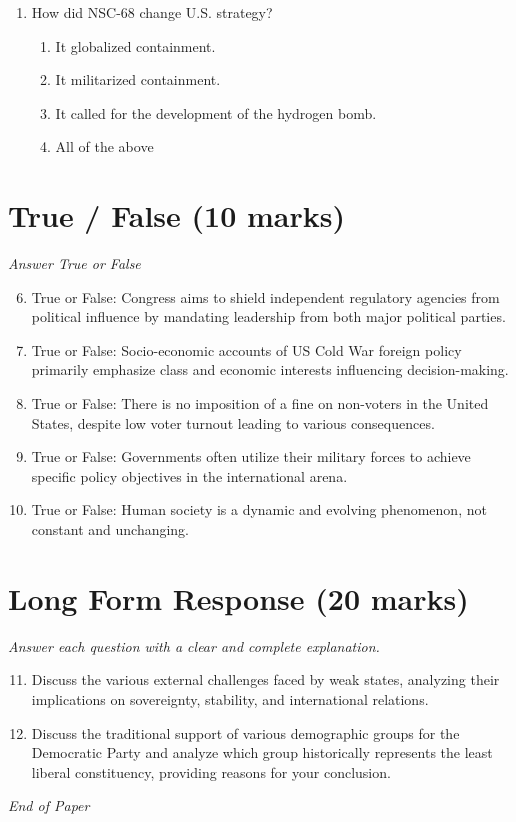 \documentclass[12pt]{article}
\begin{document}
\begin{enumerate}[label=\arabic*.]
\begin{enumerate}[label=(\alph*)]
    \item judicial restraint
    \item ex post facto lawmaking
\end{enumerate}
\item How did NSC-68 change U.S. strategy?
\begin{enumerate}[label=(\alph*)]
    \item It globalized containment.
    \item It militarized containment.
    \item It called for the development of the hydrogen bomb.
    \item All of the above
\end{enumerate}
\end{enumerate}

\section*{True / False (10 marks)}
\textit{Answer True or False}
\begin{enumerate}[label=\arabic*.]
\setcounter{enumi}{5}
\item True or False: Congress aims to shield independent regulatory agencies from political influence by mandating leadership from both major political parties.
\item True or False: Socio-economic accounts of US Cold War foreign policy primarily emphasize class and economic interests influencing decision-making.
\item True or False: There is no imposition of a fine on non-voters in the United States, despite low voter turnout leading to various consequences.
\item True or False: Governments often utilize their military forces to achieve specific policy objectives in the international arena.
\item True or False: Human society is a dynamic and evolving phenomenon, not constant and unchanging.
\end{enumerate}

\section*{Long Form Response (20 marks)}
\textit{Answer each question with a clear and complete explanation.}
\begin{enumerate}[label=\arabic*.]
\setcounter{enumi}{10}
\item Discuss the various external challenges faced by weak states, analyzing their implications on sovereignty, stability, and international relations.
\item Discuss the traditional support of various demographic groups for the Democratic Party and analyze which group historically represents the least liberal constituency, providing reasons for your conclusion.
\end{enumerate}

\vfill
\noindent\textit{End of Paper}
\end{document}
